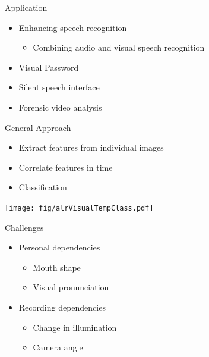 \documentclass[xcolor=table]{beamer}
\begin{document}
\begin{frame}{Application}
    \begin{itemize}
        \item Enhancing speech recognition
        \begin{itemize}
            \item Combining audio and visual speech recognition 
        \end{itemize}
        \item Visual Password 
        \item Silent speech interface
        \item Forensic video analysis 
    \end{itemize}
\end{frame}

\begin{frame}{General Approach}
    \begin{itemize}
        \item Extract features from individual images
        \item Correlate features in time
        \item Classification 
    \end{itemize}
    \begin{center}
    \texttt{[image: fig/alrVisualTempClass.pdf]}   
    \end{center}
\end{frame}

\begin{frame}{Challenges}
    \begin{itemize}
        \item Personal dependencies
        \begin{itemize}
            \item Mouth shape 
            \item Visual pronunciation  
        \end{itemize}
    \end{itemize}
    \begin{itemize}
        \item Recording dependencies 
        \begin{itemize}
            \item Change in illumination 
            \item Camera angle
        \end{itemize}
    \end{itemize}
\end{frame}
\end{document}
